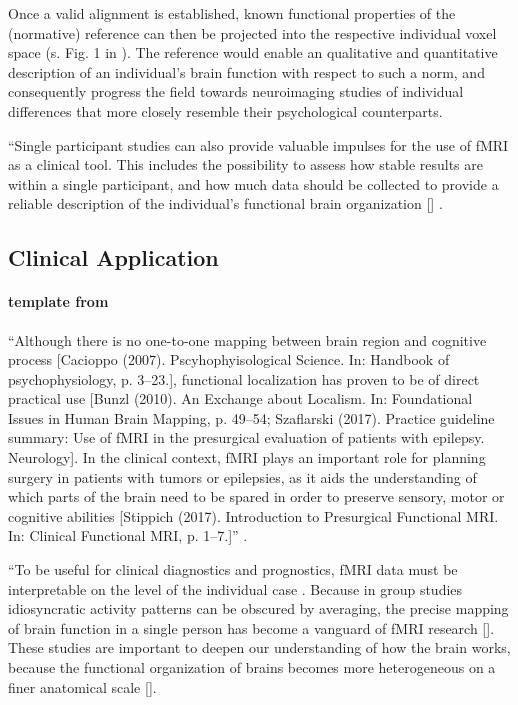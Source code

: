 %
Once a valid alignment is established, known functional properties of the
(normative) reference can then be projected into the respective individual voxel
space (s. Fig. 1 in \citep{nishimoto2016lining}).
%
The reference would enable an qualitative and quantitative description of an
individual's brain function with respect to such a norm, and consequently
progress the field towards neuroimaging studies of individual differences that
more closely resemble their psychological counterparts.

%
``Single participant studies can also provide valuable impulses for the use of
fMRI as a clinical tool.
%
This includes the possibility to assess how stable results are within a single
participant, and how much data should be collected to provide a reliable
description of the individual’s functional brain organization
[\citet{laumann2015functional, gordon2017precision}] \citep{wegrzyn2018thought}.


\subsection{Clinical Application}


\paragraph{template from \citet{wegrzyn2018thought}}

``Although there is no one-to-one mapping between brain region and cognitive
process [Cacioppo (2007). Pscyhophyisological Science. In: Handbook of
psychophysiology, p. 3–23.], functional localization has proven to be of direct
practical use [Bunzl (2010). An Exchange about Localism. In: Foundational Issues
in Human Brain Mapping, p. 49–54; Szaflarski (2017). Practice guideline summary:
Use of fMRI in the presurgical evaluation of patients with epilepsy. Neurology].
%
In the clinical context, fMRI plays an important role for planning surgery in
patients with tumors or epilepsies, as it aids the understanding of which parts
of the brain need to be spared in order to preserve sensory, motor or cognitive
abilities [Stippich (2017). Introduction to Presurgical Functional MRI. In:
Clinical Functional MRI, p. 1–7.]'' \citep{wegrzyn2018thought}.

``To be useful for clinical diagnostics and prognostics, fMRI data must be
interpretable on the level of the individual case \citep{dubois2016building}.
%
Because in group studies idiosyncratic activity patterns can be obscured by
averaging, the precise mapping of brain function in a single person has become a
vanguard of fMRI research [\citet{laumann2015functional, huth2016natural,
gordon2017precision}].
%
These studies are important to deepen our understanding of how the brain works,
because the functional organization of brains becomes more heterogeneous on a
finer anatomical scale [\citet{laumann2015functional, poldrack2017precision}].

